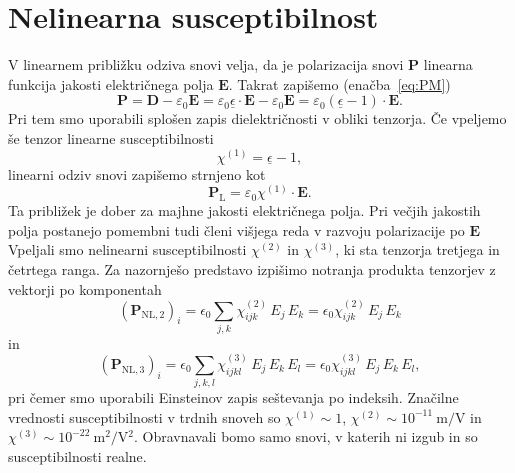 \section{Nelinearna susceptibilnost}
\label{Chap:Chi}
V linearnem približku odziva snovi velja, da je polarizacija snovi 
$\mathbf{P}$ linearna funkcija jakosti električnega polja 
$\mathbf{E}$. Takrat zapišemo (enačba~\ref{eq:PM})
\begin{equation}
\mathbf{P} = \mathbf{D} - \varepsilon_0 \mathbf{E} = 
\varepsilon_0 \underline{\epsilon} \cdot\mathbf{E} - \varepsilon_0 \mathbf{E} = 
\varepsilon_0 (\underline{\epsilon} - 1)\cdot\mathbf{E}. 
\end{equation}
Pri tem smo uporabili splošen zapis dielektričnosti v obliki tenzorja. Če vpeljemo še tenzor linearne susceptibilnosti
\begin{equation}
\chi^{(1)} = \underline{\epsilon} - 1,
\end{equation}
linearni odziv snovi zapišemo strnjeno kot
\begin{equation}
\mathbf{P}_{\mathrm{L}} =  \varepsilon_0 \chi^{(1)} \cdot \mathbf{E}.
\end{equation}
Ta približek je dober za majhne jakosti električnega polja. Pri večjih jakostih polja
postanejo pomembni tudi členi višjega reda v razvoju polarizacije
po $\mathbf{E}$
Vpeljali smo nelinearni susceptibilnosti 
$\chi^{(2)}$ in $\chi^{(3)}$, ki sta tenzorja tretjega in četrtega ranga. 
Za nazornješo predstavo izpišimo notranja produkta tenzorjev z vektorji 
po komponentah
\begin{equation}
\left(\mathbf{P}_{\mathrm{NL,2}}\right)_i= 
\epsilon_{0}\sum_{j,k}\chi^{(2)}_{ijk} \,E_j \,E_k =
\epsilon_{0}\chi^{(2)}_{ijk} \,E_j \,E_k 
\label{eq:nlin2}
\end{equation}
in 
\begin{equation}
\left(\mathbf{P}_{\mathrm{NL,3}}\right)_i= 
\epsilon_{0}\sum_{j,k,l}\chi^{(3)}_{ijkl} \,E_j \,E_k\, E_l=
\epsilon_{0}\chi^{(3)}_{ijkl} \,E_j \,E_k\, E_l,
\label{eq:nlin3}
\end{equation}
pri čemer smo uporabili Einsteinov zapis seštevanja po indeksih. Značilne vrednosti
susceptibilnosti v trdnih snoveh so $\chi^{(1)} \sim 1$, 
$\chi^{(2)} \sim 10^{-11}~\si{\metre/\volt}$ 
in $\chi^{(3)} \sim 10^{-22}~\si{\metre^2/\volt^2}$. Obravnavali bomo samo snovi, v katerih
ni izgub in so susceptibilnosti realne.

